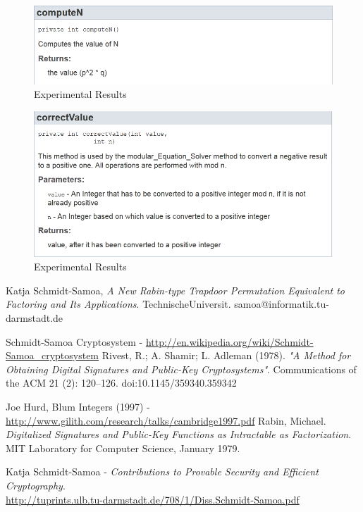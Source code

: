 \documentclass[12pt]{article} %
\begin{document}
\begin{figure}[h!]
  \centering
   \includegraphics[scale=1.0]{computeN.png}
  \caption{Experimental Results}
\end{figure}

\begin{figure}[h!]
  \centering
   \includegraphics[scale=1.0]{correctValue.png}
  \caption{Experimental Results}
\end{figure}





\newpage

\begin{thebibliography}{9}
Katja Schmidt-Samoa, 
\emph{A New Rabin-type Trapdoor Permutation Equivalent to Factoring and Its Applications}. TechnischeUniversit. samoa@informatik.tu-darmstadt.de

  Schmidt-Samoa Cryptosystem - 
 \url{http://en.wikipedia.org/wiki/Schmidt-Samoa_cryptosystem}
 Rivest, R.; A. Shamir; L. Adleman (1978). \emph{"A Method for Obtaining Digital Signatures and Public-Key Cryptosystems"}. Communications of the ACM 21 (2): 120–126. doi:10.1145/359340.359342

 Joe Hurd, Blum Integers (1997) -  \url{http://www.gilith.com/research/talks/cambridge1997.pdf}
Rabin, Michael. \emph{Digitalized Signatures and Public-Key Functions as Intractable as Factorization}. MIT Laboratory for Computer Science, January 1979.

Katja Schmidt-Samoa - \emph{Contributions to Provable Security and Efficient Cryptography}.\\\url{http://tuprints.ulb.tu-darmstadt.de/708/1/Diss.Schmidt-Samoa.pdf}
\end{thebibliography}
\end{document}
